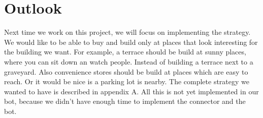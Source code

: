 \section{Outlook}
Next time we work on this project, we will focus on implementing the strategy. We would like to be able to buy and build only at places that look interesting for the building we want. For example, a terrace should be build at sunny places, where you can sit down an watch people. Instead of building a terrace next to a graveyard. Also convenience stores should be build at places which are easy to reach. Or it would be nice is a parking lot is nearby. The complete strategy we wanted to have is described in appendix A. All this is not yet implemented in our bot, because we didn't have enough time to implement the connector and the bot. 

\newpage